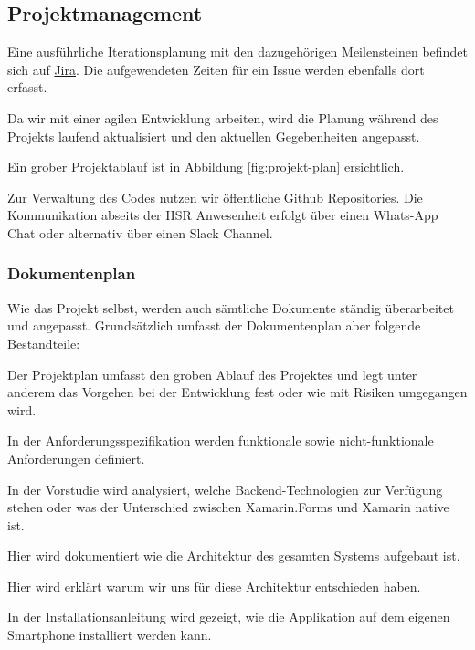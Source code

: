 \subsection{Projektmanagement}
Eine ausführliche Iterationsplanung mit den dazugehörigen Meilensteinen befindet sich auf \href{https://hsr-sa.atlassian.net/}{Jira}. Die aufgewendeten Zeiten für ein Issue werden ebenfalls dort erfasst.


Da wir mit einer agilen Entwicklung arbeiten, wird die Planung während des Projekts laufend aktualisiert und den aktuellen Gegebenheiten angepasst. 

Ein grober Projektablauf ist in Abbildung \ref{fig:projekt-plan} ersichtlich.


Zur Verwaltung des Codes nutzen wir \href{https://github.com/BrainingOutOfBox/App}{öffentliche Github Repositories}. Die Kommunikation abseits der HSR Anwesenheit erfolgt über einen Whats-App Chat oder alternativ über einen Slack Channel.

\subsubsection*{Dokumentenplan}
Wie das Projekt selbst, werden auch sämtliche Dokumente ständig überarbeitet und angepasst. Grundsätzlich umfasst der Dokumentenplan aber folgende Bestandteile:

\begin{description}[leftmargin=!,labelwidth=\widthof{\bfseries Anforderungsspezifikation}]
	\item[Projektplan] Der Projektplan umfasst den groben Ablauf des Projektes und legt unter anderem das Vorgehen bei der Entwicklung fest oder wie mit Risiken umgegangen wird.
	\item[Anforderungsspezifikation] In der Anforderungsspezifikation werden funktionale sowie nicht-funktionale Anforderungen definiert.
	\item[Vorstudie] In der Vorstudie wird analysiert, welche Backend-Technologien zur Verfügung stehen oder was der Unterschied zwischen Xamarin.Forms und Xamarin native ist.
	\item[Architekturdokumentation] Hier wird dokumentiert wie die Architektur des gesamten Systems aufgebaut ist.
	\item[Architekturentscheide] Hier wird erklärt warum wir uns für diese Architektur entschieden haben.
	\item[Installationsanleitung] In der Installationsanleitung wird gezeigt, wie die Applikation auf dem eigenen Smartphone installiert werden kann.
\end{description}
 

